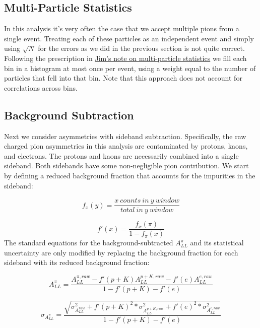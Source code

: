 \subsection{Multi-Particle Statistics}

In this analysis it's very often the case that we accept multiple pions from a single event.  Treating each of these particles as an independent event and simply using $\sqrt{N}$ for the errors as we did in the previous section is not quite correct.  Following the prescription in \href{http://www.star.bnl.gov/protected/spin/sowinski/analysis/derivations/multiParticle.pdf}{Jim's note on multi-particle statistics} we fill each bin in a histogram at most once per event, using a weight equal to the number of particles that fell into that bin.  Note that this approach does not account for correlations across bins.

\subsection{Background Subtraction}

Next we consider asymmetries with sideband subtraction. Specifically, the raw
charged pion asymmetries in this analysis are contaminated by protons, kaons,
and electrons. The protons and kaons are necessarily combined into a single
sideband. Both sidebands have some non-negligible pion contribution. We start
by defining a reduced background fraction that accounts for the impurities in
the sideband:

\begin{equation}
  f_{x}(y) = \frac{x~counts~in~y~window}{total~in~y~window}
\end{equation}

\begin{equation}
  f'(x) = \frac{f_{x}(\pi)}{1 - f_{\pi}(x)}
\end{equation}
%
The standard equations for the background-subtracted $A_{LL}^{\pi}$ and its
statistical uncertainty are only modified by replacing the background fraction
for each sideband with its reduced background fraction:

\begin{equation}
  A_{LL}^{\pi} = \frac{ A_{LL}^{\pi,raw} - f'(p+K)A_{LL}^{p+K,raw} - f'(e)A_{LL}^{e,raw} }{1 - f'(p+K) - f'(e) }
  \label{eqn:all}
\end{equation}

\begin{equation}
  \sigma_{A_{LL}^{\pi}} = \frac{\sqrt{ \sigma_{A_{LL}^{raw}}^{2} + f'(p+K)^{2} * \sigma_{A_{LL}^{p+K,raw}}^{2} + f'(e)^{2} * \sigma_{A_{LL}^{e,raw}}^{2} }}{1 - f'(p+K) - f'(e)}
  \label{eqn:sigma-all}
\end{equation}
